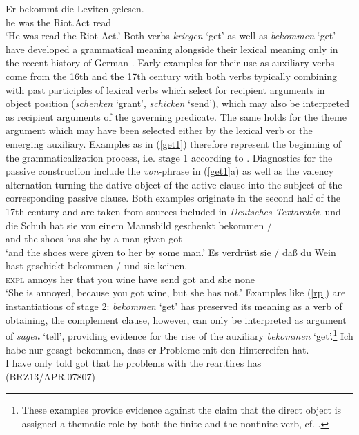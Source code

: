 \documentclass[output=paper
                ,modfonts
                ,nonflat
	        ,collection
	        ,collectionchapter
	        ,collectiontoclongg
 	        ,biblatex
                ,babelshorthands
                ,newtxmath
                ,draftmode
                ,colorlinks, citecolor=brown
]{./langsci/langscibook}
\begin{document}
\ea \label{bek} 
\gll  Er bekommt die Leviten gelesen.  \\  he was the Riot.Act read \\
\glt `He was read the Riot Act.'
\z
Both verbs \textit{kriegen} `get' as well as \textit{bekommen} `get' have developed a grammatical meaning alongside their lexical meaning only in the recent history of German \citep{glaser2005, lenz2012}. Early examples for their use as auxiliary verbs come from the 16th and the 17th century with both verbs typically combining with past participles of lexical verbs which select for recipient arguments in object position (\textit{schenken} `grant', \textit{schicken} `send'), which may also be interpreted as recipient arguments of the governing predicate. The same holds for the theme argument which may have been selected either by the lexical verb or the emerging auxiliary. Examples as in (\ref{get1}) therefore represent the beginning of the grammaticalization process, i.e. stage 1 according to \cite[63]{ebert78}. Diagnostics for the passive construction include the \textit{von}-phrase in (\ref{get1}a) as well as the valency alternation turning the dative object of the active clause into the subject of the corresponding passive clause. Both examples originate in the second half of the 17th century and are taken from sources included in \textit{Deutsches Textarchiv}. 
\eal \label{get1}
\ex
\gll und die Schuh hat sie von einem Mannsbild geschenkt bekommen / \\  and the shoes has she by a man given got  \\ 
\glt `and the shoes were given to her by some man.' 
\ex
\gll  Es verdrüst sie / daß du Wein hast geschickt bekommen / und sie keinen.  \\  \textsc{expl} annoys her {} that you wine have send got {} and she none  \\ 
\glt `She is annoyed, because you got wine, but she has not.'
\zl
Examples like (\ref{rp}) are instantiations of stage 2: \textit{bekommen} `get' has preserved its meaning as a verb of obtaining, the complement clause, however, can only be interpreted as argument of \textit{sagen} `tell', providing evidence for the rise of the auxiliary \textit{bekommen} `get'.\footnote{These examples provide evidence against the claim that the direct object is assigned a thematic role by both the finite and the nonfinite verb, cf. \cite{haider1986}.} 
\ea \label{rp} 
\gll  Ich habe nur gesagt bekommen, dass er Probleme mit den Hinterreifen hat.  \\  I have only told got that he problems with the rear.tires has \\ \hfill  (BRZ13/APR.07807)
\end{document}
